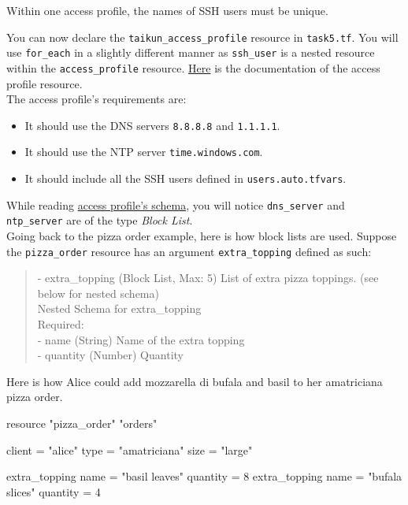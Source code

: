 \begin{warn}
Within one access profile, the names of SSH users must be unique.
\end{warn}

You can now declare the \texttt{taikun\_access\_profile} resource in \texttt{task5.tf}.
You will use \texttt{for\_each} in a slightly different manner as \texttt{ssh\_user} is a nested resource
within the \texttt{access\_profile} resource.
\href{https://intuinewin.github.io/taikun-docs/resources/access_profile.html}{Here}
is the documentation of the access profile resource.\\

The access profile's requirements are:
\begin{itemize}
  \item It should use the DNS servers \texttt{8.8.8.8} and \texttt{1.1.1.1}.
  \item It should use the NTP server \texttt{time.windows.com}.
  \item It should include all the SSH users defined in \texttt{users.auto.tfvars}.
\end{itemize}

\begin{tip}
While reading \href{https://intuinewin.github.io/taikun-docs/resources/access_profile.html}{access profile's schema},
you will notice \texttt{dns\_server} and \texttt{ntp\_server} are of the type \textit{Block List}.\\

Going back to the pizza order example, here is how block lists are used.
Suppose the \texttt{pizza\_order} resource has an argument \texttt{extra\_topping} defined as such:
\begin{quote}
- extra\_topping (Block List, Max: 5) List of extra pizza toppings. (see below for nested schema)\\

Nested Schema for extra\_topping\\
Required:\\
- name (String) Name of the extra topping\\
- quantity (Number) Quantity
\end{quote}
Here is how Alice could add mozzarella di bufala and basil to her amatriciana pizza order.
\begin{tf}
resource "pizza_order" "orders" {
  client = "alice"
  type   = "amatriciana"
  size   = "large"

  extra_topping {
    name = "basil leaves"
    quantity = 8
  }
  extra_topping {
    name = "bufala slices"
    quantity = 4
  }
}
\end{tf}
\end{tip}

